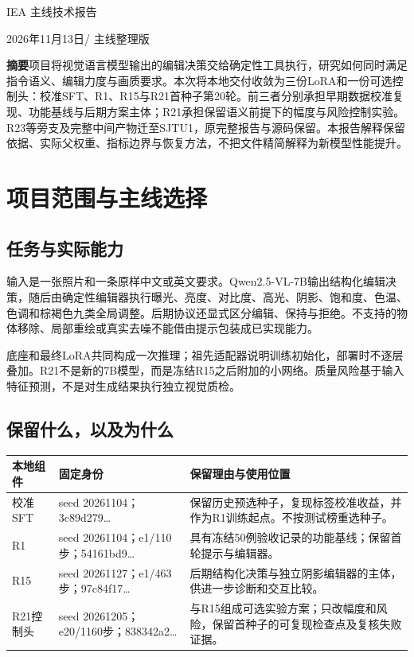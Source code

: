 \documentclass[UTF8,fontset=none,zihao=5,a4paper]{ctexart}
\begin{document}
\begin{center}
{\fontsize{25}{33}\selectfont IEA 主线技术报告\par}
\vspace{5pt}{\Large 中英文指令图像编辑：模型收敛与可复现工程\par}
\vspace{5pt}2026年11月13日\quad / \quad 主线整理版
\end{center}
\noindent\textbf{摘要}\quad 项目将视觉语言模型输出的编辑决策交给确定性工具执行，研究如何同时满足指令语义、编辑力度与画质要求。本次将本地交付收敛为三份LoRA和一份可选控制头：校准SFT、R1、R15与R21首种子第20轮。前三者分别承担早期数据校准复现、功能基线与后期方案主体；R21承担保留语义前提下的幅度与风险控制实验。R23等旁支及完整中间产物迁至SJTU1，原完整报告与源码保留。本报告解释保留依据、实际父权重、指标边界与恢复方法，不把文件精简解释为新模型性能提升。

\section{项目范围与主线选择}
\subsection{任务与实际能力}
输入是一张照片和一条原样中文或英文要求。Qwen2.5-VL-7B输出结构化编辑决策，随后由确定性编辑器执行曝光、亮度、对比度、高光、阴影、饱和度、色温、色调和棕褐色九类全局调整。后期协议还显式区分编辑、保持与拒绝。不支持的物体移除、局部重绘或真实去噪不能借由提示包装成已实现能力。

底座和最终LoRA共同构成一次推理；祖先适配器说明训练初始化，部署时不逐层叠加。R21不是新的7B模型，而是冻结R15之后附加的小网络。质量风险基于输入特征预测，不是对生成结果执行独立视觉质检。

\subsection{保留什么，以及为什么}
\noindent\begin{tabularx}{\linewidth}{@{}P{2.5cm}P{3.4cm}Y@{}}\toprule
本地组件 & 固定身份 & 保留理由与使用位置\\\midrule
校准SFT & seed 20261104；3c89d279… & 保留历史预选种子，复现标签校准收益，并作为R1训练起点。不按测试榜重选种子。\\
R1 & seed 20261104；e1/110步；54161bd9… & 具有冻结50例验收记录的功能基线；保留首轮提示与编辑器。\\
R15 & seed 20261127；e1/463步；97c84f17… & 后期结构化决策与独立阴影编辑器的主体，供进一步诊断和交互比较。\\
R21控制头 & seed 20261205；e20/1160步；838342a2… & 与R15组成可选实验方案；只改幅度和风险，保留首种子的可复现检查点及复核失败证据。\\\bottomrule
\end{tabularx}
\end{document}
